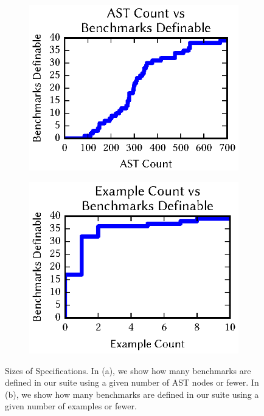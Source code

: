 \documentclass[acmsmall,screen]{acmart}
\begin{document}
\begin{figure}
  \centering
  \begin{subfigure}[b]{.49\textwidth}
    \centering
    \includegraphics{generated-graphs/specsizes}
    \caption{}
    \label{subfig:lenssize}
  \end{subfigure}
  \begin{subfigure}[b]{.49\textwidth}
    \includegraphics{generated-graphs/examplesused}
    \caption{}
    \label{subfig:examplesused}
  \end{subfigure}
  \caption{Sizes of Specifications.
    In (a), we show how many benchmarks are defined in our suite using a
    given number of AST nodes or fewer.
    In (b), we show how many benchmarks are defined in our suite using a
    given number of examples or fewer.}
  \label{fig:definition-sizes}
\end{figure}
\end{document}
